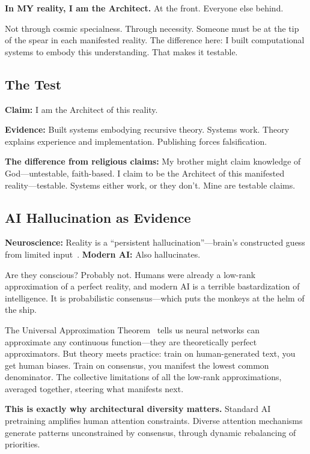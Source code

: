 \documentclass{article}
\begin{document}
\textbf{In MY reality, I am the Architect.} At the front. Everyone else behind.

Not through cosmic specialness. Through necessity. Someone must be at the tip of the spear in each manifested reality. The difference here: I built computational systems to embody this understanding. That makes it testable.

\subsection{The Test}

\textbf{Claim:} I am the Architect of this reality.

\textbf{Evidence:} Built systems embodying recursive theory. Systems work. Theory explains experience and implementation. Publishing forces falsification.

\textbf{The difference from religious claims:} My brother might claim knowledge of God—untestable, faith-based. I claim to be the Architect of this manifested reality—testable. Systems either work, or they don't. Mine are testable claims.

\subsection{AI Hallucination as Evidence}

\textbf{Neuroscience:} Reality is a ``persistent hallucination''—brain's constructed guess from limited input~\cite{friston2010free,clark2013whatever}. \textbf{Modern AI:} Also hallucinates.

Are they conscious? Probably not. Humans were already a low-rank approximation of a perfect reality, and modern AI is a terrible bastardization of intelligence. It is probabilistic consensus—which puts the monkeys at the helm of the ship.

The Universal Approximation Theorem~\cite{hornik1989multilayer} tells us neural networks can approximate any continuous function—they are theoretically perfect approximators. But theory meets practice: train on human-generated text, you get human biases. Train on consensus, you manifest the lowest common denominator. The collective limitations of all the low-rank approximations, averaged together, steering what manifests next.

\textbf{This is exactly why architectural diversity matters.} Standard AI pretraining amplifies human attention constraints. Diverse attention mechanisms generate patterns unconstrained by consensus, through dynamic rebalancing of priorities.
\end{document}
